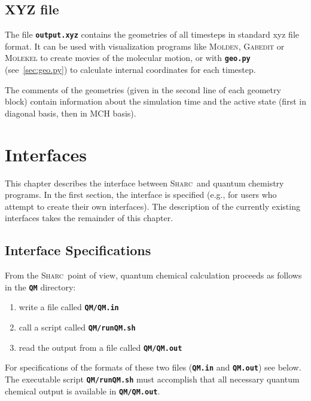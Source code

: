 \documentclass[a4paper,11pt,DIV=15,openany,twoside=false]{scrbook}
\newcommand{\sharc}{\textsc{Sharc}}
\newcommand{\ttt}[1]{\textbf{\texttt{#1}}}
\begin{document}
\section{XYZ file}\label{sec:xyzfile}

The file \ttt{output.xyz} contains the geometries of all timesteps in standard xyz file format. It can be used with visualization programs like \textsc{Molden}, \textsc{Gabedit} or \textsc{Molekel} to create movies of the molecular motion, or with \ttt{geo.py} (see~\ref{sec:geo.py}) to calculate internal coordinates for each timestep.

The comments of the geometries (given in the second line of each geometry block) contain information about the simulation time and the active state (first in diagonal basis, then in MCH basis).



\chapter{Interfaces}\label{chap:interfaces}

This chapter describes the interface between \sharc\ and quantum chemistry programs. In the first section, the interface is specified (e.g., for users who attempt to create their own interfaces). The description of the currently existing interfaces takes the remainder of this chapter.


\section{Interface Specifications}

From the \sharc\ point of view, quantum chemical calculation proceeds as follows in the \ttt{QM} directory:
\begin{enumerate}
  \item write a file called \ttt{QM/QM.in}
  \item call a script called \ttt{QM/runQM.sh}
  \item read the output from a file called \ttt{QM/QM.out}
\end{enumerate}
For specifications of the formats of these two files (\ttt{QM.in} and \ttt{QM.out}) see below. The executable script \ttt{QM/runQM.sh} must accomplish that all necessary quantum chemical output is available in \ttt{QM/QM.out}.
\end{document}

